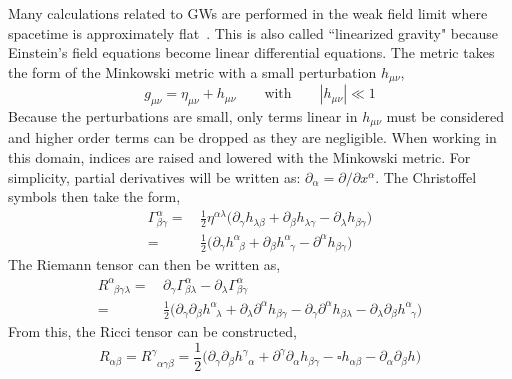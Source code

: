 Many calculations related to GWs are performed in the weak field limit where spacetime is approximately flat~\cite{flanagan2005basics}. This is also called ``linearized gravity" because Einstein's field equations become linear differential equations. The metric takes the form of the Minkowski metric with a small perturbation $h_{\mu\nu}$,
\begin{equation}
    g_{\mu\nu} = \eta_{\mu\nu} + h_{\mu\nu} \quad\quad \text{with} \quad\quad |h_{\mu\nu}| \ll 1
\end{equation}
Because the perturbations are small, only terms linear in $h_{\mu\nu}$ must be considered and higher order terms can be dropped as they are negligible. When working in this domain, indices are raised and lowered with the Minkowski metric. For simplicity, partial derivatives will be written as: $\partial_{\alpha} = \partial / \partial x^{\alpha}$. The Christoffel symbols then take the form,
\begin{equation}
    \begin{split}
    \Gamma^{\alpha}_{\beta\gamma} =& \,\frac{1}{2}\eta^{\alpha\lambda}\big(\partial_{\gamma}h_{\lambda\beta} + \partial_{\beta}h_{\lambda\gamma} - \partial_{\lambda}h_{\beta\gamma}\big) \\
    =& \,\frac{1}{2}\big(\partial_{\gamma}h^{\alpha}_{\;\;\beta} + \partial_{\beta}h^{\alpha}_{\;\;\gamma} - \partial^{\alpha}h_{\beta\gamma}\big)
    \end{split}
\end{equation}
The Riemann tensor can then be written as,
\begin{equation}
    \begin{split}
    R^{\alpha}_{\;\;\beta\gamma\lambda} =& \,\partial_{\gamma}\Gamma^{\alpha}_{\beta\lambda} - \partial_{\lambda}\Gamma^{\alpha}_{\beta\gamma} \\
    =& \,\frac{1}{2}\big(\partial_{\gamma}\partial_{\beta}h^{\alpha}_{\;\;\lambda} + \partial_{\lambda}\partial^{\alpha}h_{\beta\gamma} - \partial_{\gamma}\partial^{\alpha}h_{\beta\lambda} - \partial_{\lambda}\partial_{\beta}h^{\alpha}_{\;\;\gamma}\big)
    \end{split}
\end{equation}
From this, the Ricci tensor can be constructed,
\begin{equation}
    R_{\alpha\beta} = R^{\gamma}_{\;\;\alpha\gamma\beta} = \frac{1}{2}\big(\partial_{\gamma}\partial_{\beta}h^{\gamma}_{\;\;\alpha} + \partial^{\gamma}\partial_{\alpha}h_{\beta\gamma} - \square h_{\alpha\beta} - \partial_{\alpha}\partial_{\beta}h\big)
\end{equation}

